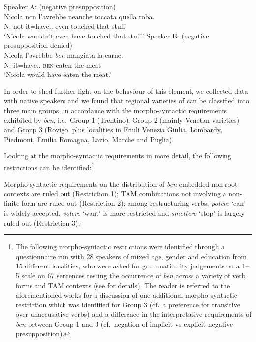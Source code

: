 \documentclass[output=paper]{langsci/langscibook}
\begin{document}
\ea {}
	\ea Speaker A: (negative presupposition)\\
		\gll    Nicola non l’avrebbe neanche toccata quella roba.\\
			    N. not it=have.\Cond{}.\Tsg{} even touched that stuff\\
        \glt    \enquote*{Nicola wouldn’t even have touched that stuff.}
	\ex Speaker B: (negative presupposition denied)\\
		\gll    Nicola l’avrebbe \textit{ben} mangiata la carne.\\
			    N. it=have.\Cond{}.\Tsg{} \textsc{ben} eaten the meat\\
        \glt    \enquote*{Nicola would have eaten the meat.}
	\z
\z

In order to shed further light on the behaviour of this element, we collected
data with native speakers and we found that regional varieties of  can
be classified into three main groups, in accordance with the morpho-syntactic
requirements exhibited by \emph{ben}, i.e.\ Group 1 (Trentino), Group 2 (mainly
Venetan varieties) and Group 3 (Rovigo, plus localities in Friuli Venezia
Giulia, Lombardy, Piedmont, Emilia Romagna, Lazio, Marche and Puglia).

Looking at the morpho-syntactic requirements in more detail, the following
restrictions can be identified:\footnote{The following morpho-syntactic
    restrictions were identified through a questionnaire run with 28 speakers
    of mixed age, gender and education from 15 different localities, who were
    asked for grammaticality judgements on a 1--5 scale on 67 sentences
    testing the occurrence of \emph{ben} across a variety of verb forms and
    \gls{TAM} contexts (see \citealt{CognSchi2018b,CognSchi2018} for details).
    The reader is referred to the aforementioned works for a discussion of one
    additional morpho-syntactic restriction which was identified for Group 3
    (cf.\ a preference for transitive over unaccusative verbs) and a difference
    in the interpretative requirements of \emph{ben} between Group 1 and 3
    (cf.\ negation of implicit vs explicit negative presupposition).}

\newpage

\ea\label{ex:schifano:12.3} Morpho-syntactic requirements on the distribution of
        \emph{ben}
	\ea embedded non-root contexts are ruled out (Restriction 1);
    \ex \gls{TAM} combinations not involving a non-finite form are ruled out
        (Restriction 2);
    \ex among restructuring verbs, \emph{potere} ‘can’ is widely accepted,
        \emph{volere} ‘want’ is more restricted and
        \emph{smettere} ‘stop’ is largely ruled out (Restriction 3);
	\z
\z
\end{document}
